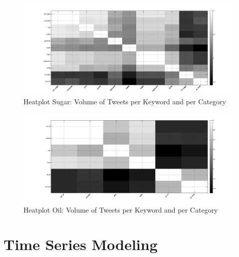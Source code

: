 \begin{figure}[H]
        \centering
         \includegraphics[width=1\textwidth ]{img/anal/sugar_black}
              
        \caption{Heatplot Sugar: Volume of Tweets per Keyword and per Category}
        \label{fig:sugar_heat}
\end{figure}

\begin{figure}[H]
        \centering
         \includegraphics[width=1\textwidth ]{img/anal/black_oil}
              
        \caption{Heatplot Oil: Volume of Tweets per Keyword and per Category}
        \label{fig:oil_heat}
\end{figure}



\chapter{Time Series Modeling}
\label{ts_model}



